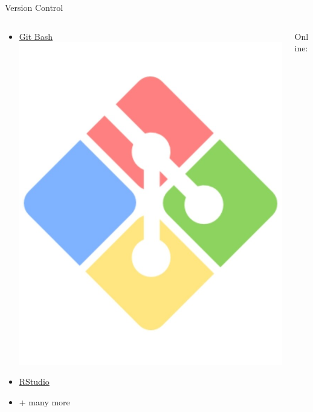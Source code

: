 \documentclass{beamer} %
\begin{document}
\begin{frame}{Version Control}
\begin{columns}
\begin{column}{0.5\textwidth}
\begin{itemize}
          \item \href{https://gitforwindows.org/}{Git Bash \includegraphics[height=.07\textheight]{gitbash}}
          \item \href{https://www.rstudio.com/}{RStudio}
          \item + many more
        \end{itemize}
      \end{column}  
      \begin{column}[t]{0.5\textwidth}
        Online:
        \begin{itemize}

\end{itemize}
\end{column}
\end{columns}
\end{frame}
\end{document}

